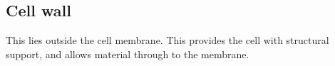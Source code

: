 
\subsection{Cell wall}

This lies outside the cell membrane. This provides the cell with structural support, and allows material through to the membrane.


